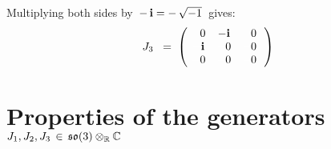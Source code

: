 Multiplying both sides by \,$-\,\textnormal{\bf i} = -\,\sqrt{-1}$\, gives:
\begin{equation*}
J_{3}
\;\; = \;
	\left(\!
		\begin{array}{ccc}
			{\color{white}-}0 & {\color{black}-}\i & {\color{white}-}0 \\
			{\color{white}-}\i & {\color{white}-}0 & {\color{white}-}0 \\
			{\color{white}-}0 & {\color{white}-}0 & {\color{white}-}0 \\
			\end{array}
		\,\right)
\end{equation*}


\section{Properties of the generators \,$J_{1}, J_{2}, J_{3} \,\in\, \mathfrak{so}(3) \otimes_{\mathbb{R}} \mathbb{C}$}


